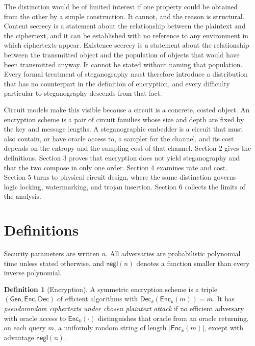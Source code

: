 \documentclass[11pt]{article}
\theoremstyle{definition}
\newtheorem{definition}{Definition}
\theoremstyle{remark}
\newcommand{\negl}{\mathsf{negl}}
\newcommand{\Enc}{\mathsf{Enc}}
\newcommand{\Dec}{\mathsf{Dec}}
\begin{document}
The distinction would be of limited interest if one property could be obtained from the other by a simple construction. It cannot, and the reason is structural. Content secrecy is a statement about the relationship between the plaintext and the ciphertext, and it can be established with no reference to any environment in which ciphertexts appear. Existence secrecy is a statement about the relationship between the transmitted object and the population of objects that would have been transmitted anyway. It cannot be stated without naming that population. Every formal treatment of steganography must therefore introduce a distribution that has no counterpart in the definition of encryption, and every difficulty particular to steganography descends from that fact.

Circuit models make this visible because a circuit is a concrete, costed object. An encryption scheme is a pair of circuit families whose size and depth are fixed by the key and message lengths. A steganographic embedder is a circuit that must also contain, or have oracle access to, a sampler for the channel, and its cost depends on the entropy and the sampling cost of that channel. Section 2 gives the definitions. Section 3 proves that encryption does not yield steganography and that the two compose in only one order. Section 4 examines rate and cost. Section 5 turns to physical circuit design, where the same distinction governs logic locking, watermarking, and trojan insertion. Section 6 collects the limits of the analysis.

\section{Definitions}

Security parameters are written $n$. All adversaries are probabilistic polynomial time unless stated otherwise, and $\negl(n)$ denotes a function smaller than every inverse polynomial.

\begin{definition}[Encryption]
A symmetric encryption scheme is a triple $(\mathsf{Gen},\Enc,\Dec)$ of efficient algorithms with $\Dec_k(\Enc_k(m))=m$. It has \emph{pseudorandom ciphertexts under chosen plaintext attack} if no efficient adversary with oracle access to $\Enc_k(\cdot)$ distinguishes that oracle from an oracle returning, on each query $m$, a uniformly random string of length $|\Enc_k(m)|$, except with advantage $\negl(n)$.
\end{definition}
\end{document}
